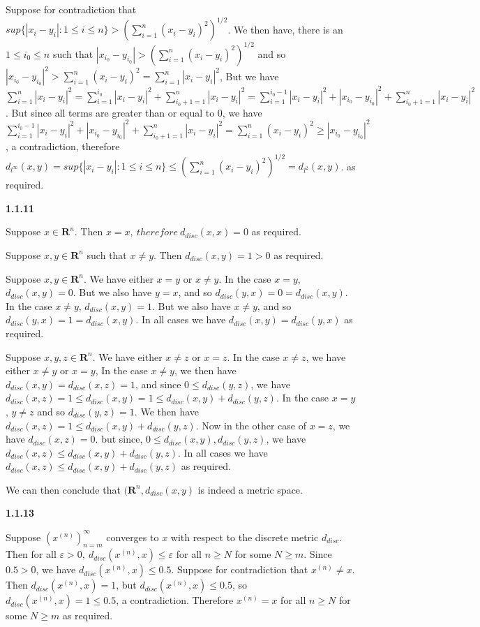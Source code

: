 \documentclass[12pt]{article}
\begin{document}
Suppose for contradiction that $sup\{|x_i-y_i|:1\leq i\leq n\}>(\sum_{i=1}^n(x_i-y_i)^2)^{1/2}$. We then have, there is an $1\leq i_0\leq n$ such that $|x_{i_0}-y_{i_0}|>(\sum_{i=1}^n(x_i-y_i)^2)^{1/2}$ and so $|x_{i_0}-y_{i_0}|^2>\sum_{i=1}^n(x_i-y_i)^2=\sum_{i=1}^n|x_i-y_i|^2$, But we have $\sum_{i=1}^n|x_i-y_i|^2 = \sum_{i=1}^{i_0}|x_i-y_i|^2 + \sum_{i_0+1=1}^{n}|x_i-y_i|^2 =\sum_{i=1}^{i_0-1}|x_i-y_i|^2 + |x_{i_0}-y_{i_0}|^2+\sum_{i_0+1=1}^{n}|x_i-y_i|^2 $. But since all terms are greater than or equal to 0, we have $\sum_{i=1}^{i_0-1}|x_i-y_i|^2 + |x_{i_0}-y_{i_0}|^2+\sum_{i_0+1=1}^{n}|x_i-y_i|^2 = \sum_{i=1}^n(x_i-y_i)^2 \geq |x_{i_0}-y_{i_0}|^2$, a contradiction, therefore $d_{l^\infty}(x,y)=sup\{|x_i-y_i|:1\leq i\leq n\}\leq (\sum_{i=1}^n(x_i-y_i)^2)^{1/2}=d_{l^2}(x,y)$. as required.


\textbf{1.1.11}

Suppose $x\in \textbf{R}^n$. Then $x=x,\ therefore \ d_{disc}(x,x) = 0$ as required. 

Suppose $x,y\in \textbf{R}^n$ such that $x\neq y$. Then $d_{disc}(x,y) = 1>0$ as required. 

Suppose $x,y\in \textbf{R}^n$. We have either $x=y$ or $x\neq y$. In the case $x=y$, $d_{disc}(x,y) = 0$. But we also have $y=x$, and so $d_{disc}(y,x) = 0=d_{disc}(x,y)$. In the case $x\neq y$, $d_{disc}(x,y) = 1$. But we also have $x\neq y$, and so $d_{disc}(y,x) = 1=d_{disc}(x,y)$. In all cases we have $d_{disc}(x,y) = d_{disc}(y,x)$ as required. 

Suppose $x,y,z\in \textbf{R}^n$. We have either $x\neq z$ or $x=z$. In the case $x\neq z$, we have either $x\neq y$ or $x=y$, In the case $x\neq y$, we then have $d_{disc}(x,y) =d_{disc}(x,z) = 1$, and since $0\leq d_{disc}(y,z)$, we have $d_{disc}(x,z)=1 \leq d_{disc}(x,y) = 1 \leq d_{disc}(x,y)+d_{disc}(y,z)$. In the case $x=y$, $y\neq z$ and so $d_{disc}(y,z) = 1$. We then have $d_{disc}(x,z)=1\leq d_{disc}(x,y)+d_{disc}(y,z)$. Now in the other case of $x=z$, we have $d_{disc}(x,z) = 0$. but since, $0\leq d_{disc}(x,y), d_{disc}(y,z)$, we have $d_{disc}(x,z)\leq d_{disc}(x,y)+d_{disc}(y,z)$. In all cases we have $d_{disc}(x,z)\leq d_{disc}(x,y)+d_{disc}(y,z)$ as required.

We can then conclude that $(\textbf{R}^n,d_{disc}(x,y)$ is indeed a metric space.

\textbf{1.1.13}

Suppose $(x^{(n)})_{n=m}^\infty$ converges to $x$ with respect to the discrete metric $d_{disc}$. Then for all $\varepsilon>0, \ d_{disc}(x^{(n)},x) \leq \varepsilon $ for all $n\geq N$ for some $N\geq m$. Since $0.5> 0$, we have $d_{disc}(x^{(n)},x)\leq 0.5$. Suppose for contradiction that $x^{(n)}\neq x$. Then $d_{disc}(x^{(n)},x) = 1$, but $d_{disc}(x^{(n)},x) \leq 0.5$, so $d_{disc}(x^{(n)},x) = 1 \leq 0.5$, a contradiction. 
Therefore $x^{(n)} = x$ for all $n\geq N$ for some $N\geq m$ as required. 
\end{document}
